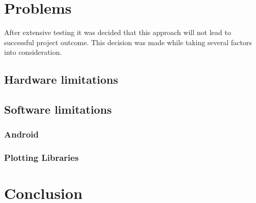 \chapter{Problems}
\label{ch:Problems}

After extensive testing it was decided that this approach will not lead to successful project outcome. This decision was made while taking several factors into consideration.

\section{Hardware limitations}

\section{Software limitations}
\subsection{Android}
\subsection{Plotting Libraries}

\chapter{Conclusion}
